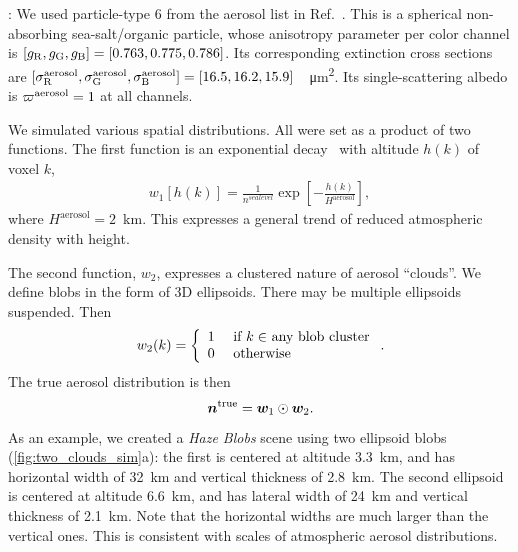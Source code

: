 \documentclass[10pt,letterpaper]{article}
\begin{document}
: We used particle-type 6 from the aerosol list
in Ref.~\cite{Martonchik2009}. This is a spherical non-absorbing
sea-salt/organic particle, whose anisotropy parameter per color
channel is $[g_{\rm R},g_{\rm G},g_{\rm B}]=[0.763,0.775,0.786]$. Its
corresponding extinction cross sections are $[\sigma^{\rm
  aerosol}_{\rm R}, \sigma^{\rm aerosol}_{\rm G}, \sigma^{\rm
  aerosol}_{\rm
  B}]=[16.5,16.2,15.9]$~\si[sticky-per]{\per\micro\meter\squared}.
Its single-scattering albedo is $\varpi^{\rm aerosol}=1$ at all
channels.

We simulated various spatial distributions. All were set as a product
of two functions. The first function is an exponential
decay~\cite{Levi1980} with altitude $h(k)$ of voxel $k$,
\begin{align}
  w_1[h(k)] = \frac{1} {n^{sea level}}
  \exp\left[-\frac{h(k)}{H^\mathrm{aerosol}}\right],
\end{align}
where $H^\mathrm{aerosol}=2$~\si{\km}. This expresses a general trend
of reduced atmospheric density with height.

The second function, $w_2$, expresses a clustered nature of aerosol
``clouds''. We define blobs in the form of 3D ellipsoids. There may be
multiple ellipsoids suspended.  Then
\begin{equation}
  w_2(k) =
  \left\{
    \begin{array}{ll}
      1  & \mbox{ if $k\in$ any blob cluster} \\
      0  & \mbox{ otherwise}
      \label{eq:f2}
    \end{array}
  \right.
  .
  \hspace{-0.05cm}
\end{equation}
The true aerosol distribution is then
\begin{equation}
  \label{eq:ntrue}
  {\bm n}^{\rm true}={\bm w}_1\odot {\bm w}_2  .
  \hspace{-0.05cm}
\end{equation}
As an example, we created a {\em Haze Blobs} scene using two ellipsoid
blobs (\cref{fig:two_clouds_sim}a): the first is centered at altitude
\SI{3.3}{\km}, and has horizontal width of \SI{32}{\km} and vertical
thickness of \SI{2.8}{\km}. The second ellipsoid is centered at
altitude \SI{6.6}{\km}, and has lateral width of \SI{24}{\km} and
vertical thickness of \SI{2.1}{\km}. Note that the horizontal widths
are much larger than the vertical ones. This is consistent with scales
of atmospheric aerosol distributions.
\end{document}
